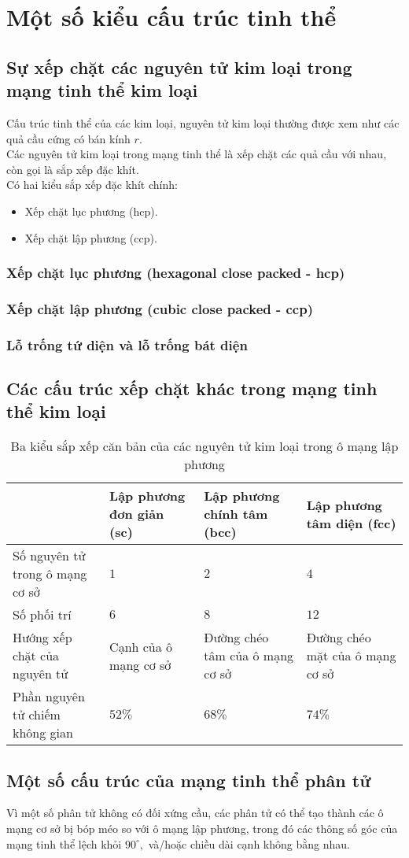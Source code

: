 \section{Một số kiểu cấu trúc tinh thể}
\subsection{Sự xếp chặt các nguyên tử kim loại trong mạng tinh thể kim loại}
Cấu trúc tinh thể của các kim loại, nguyên tử kim loại thường được xem như các quả cầu cứng có bán kính $r.$\\
Các nguyên tử kim loại trong mạng tinh thể là xếp chặt các quả cầu với nhau, còn gọi là sắp xếp đặc khít.\\
Có hai kiểu sắp xếp đặc khít chính:
\begin{itemize}
\item Xếp chặt lục phương (hcp).
\item Xếp chặt lập phương (ccp).
\end{itemize}
\subsubsection{Xếp chặt lục phương (hexagonal close packed - hcp)}
\subsubsection{Xếp chặt lập phương (cubic close packed - ccp)}
\subsubsection{Lỗ trống tứ diện và lỗ trống bát diện}
\subsection{Các cấu trúc xếp chặt khác trong mạng tinh thể kim loại}
\begin{table}[H]
\begin{tabular}{p{} |
                   p{} |
                   p{} |
                   p{} | }
\hline 
 & Lập phương đơn giản (sc) & Lập phương chính tâm (bcc) & Lập phương tâm diện (fcc) \\ 
\hline 
Số nguyên tử trong ô mạng cơ sở & $1$ & $2$ & $4$ \\ 
\hline 
Số phối trí & $6$ & $8$ & $12$ \\ 
\hline 
Hướng xếp chặt của nguyên tử & Cạnh của ô mạng cơ sở & Đường chéo tâm của ô mạng cơ sở & Đường chéo mặt của ô mạng cơ sở \\ 
\hline 
Phần nguyên tử chiếm không gian & $52 \%$ & $68 \%$ & $74 \%$ \\ 
\hline 
\end{tabular} 
\caption{Ba kiểu sắp xếp căn bản của các nguyên tử kim loại trong ô mạng lập phương}
\end{table}
\subsection{Một số cấu trúc của mạng tinh thể phân tử}
Vì một số phân tử không có đối xứng cầu, các phân tử có thể tạo thành các ô mạng cơ sở bị bóp méo so với ô mạng lập phương, trong đó các thông số góc của mạng tinh thể lệch khỏi $90 ^\circ,$ và/hoặc chiều dài cạnh không bằng nhau.